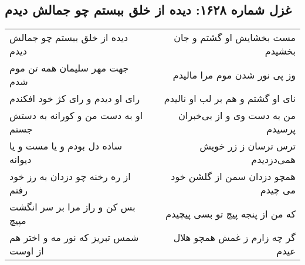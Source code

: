 \begin{center}
\section*{غزل شماره ۱۶۲۸: دیده از خلق ببستم چو جمالش دیدم}
\label{sec:1628}
\begin{longtable}{l p{0.5cm} r}
دیده از خلق ببستم چو جمالش دیدم
&&
مست بخشایش او گشتم و جان بخشیدم
\\
جهت مهر سلیمان همه تن موم شدم
&&
وز پی نور شدن موم مرا مالیدم
\\
رای او دیدم و رای کژ خود افکندم
&&
نای او گشتم و هم بر لب او نالیدم
\\
او به دست من و کورانه به دستش جستم
&&
من به دست وی و از بی‌خبران پرسیدم
\\
ساده دل بودم و یا مست و یا دیوانه
&&
ترس ترسان ز زر خویش همی‌دزدیدم
\\
از ره رخنه چو دزدان به رز خود رفتم
&&
همچو دزدان سمن از گلشن خود می چیدم
\\
بس کن و راز مرا بر سر انگشت مپیچ
&&
که من از پنجه پیچ تو بسی پیچیدم
\\
شمس تبریز که نور مه و اختر هم از اوست
&&
گر چه زارم ز غمش همچو هلال عیدم
\\
\end{longtable}
\end{center}

